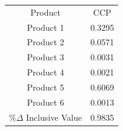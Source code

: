 \begin{tabular}{cc}
Product & CCP \\
Product 1 & 0.3295 \\
Product 2 & 0.0571 \\
Product 3 & 0.0031 \\
Product 4 & 0.0021 \\
Product 5 & 0.6069 \\
Product 6 & 0.0013 \\
$\%\Delta$ Inclusive Value & 0.9835 \\
\end{tabular}